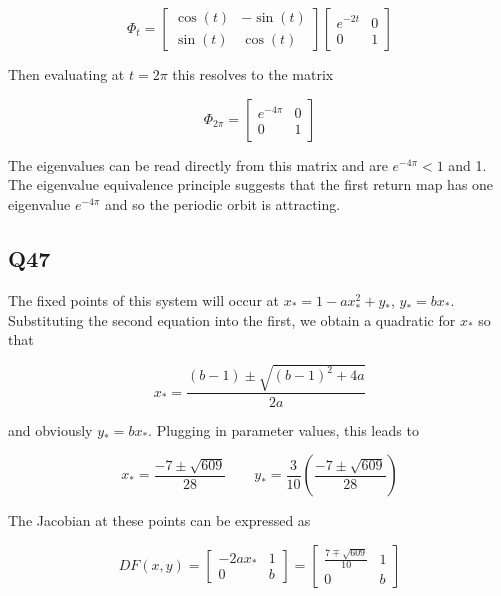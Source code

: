 \documentclass{article}
\begin{document}
\begin{equation*}
	\Phi_t = 
	\begin{bmatrix}
		\cos(t) & -\sin(t) \\ \sin(t) & \cos(t)
	\end{bmatrix}
	\begin{bmatrix}
		e^{-2t} & 0 \\ 0 & 1
	\end{bmatrix}
\end{equation*}

Then evaluating at $t = 2\pi$ this resolves to the matrix 

\begin{equation*}
	\Phi_{2\pi} = 
	\begin{bmatrix}
		e^{-4\pi} & 0 \\ 0 & 1
	\end{bmatrix}
\end{equation*}

The eigenvalues can be read directly from this matrix and are $e^{-4\pi} < 1$ and 1. The 
eigenvalue equivalence principle suggests that the first return map has one eigenvalue $e^{-4\pi}$ 
and so the periodic orbit is attracting.

\subsection*{Q47}
The fixed points of this system will occur at $x_* = 1 - ax_*^2 + y_*$, $y_* = bx_*$. Substituting 
the second equation into the first, we obtain a quadratic for $x_*$ so that 

\begin{equation*}
	x_* = \frac{(b-1) \pm \sqrt{(b-1)^2 + 4a}}{2a}
\end{equation*}

and obviously $y_* = bx_*$. Plugging in parameter values, this leads to 

\begin{equation*}
	x_* = \frac{-7 \pm \sqrt{609}}{28} \qquad y_* = \frac{3}{10}\left(\frac{-7 \pm \sqrt{609}}{28}\right)
\end{equation*}

The Jacobian at these points can be expressed as 

\begin{equation*}
	DF(x,y) = 
	\begin{bmatrix}
		-2ax_* & 1 \\ 0 & b
	\end{bmatrix} 
	=
	\begin{bmatrix}
		\frac{7 \mp \sqrt{609}}{10} & 1 \\ 0 & b
	\end{bmatrix}
\end{equation*}
\end{document}
